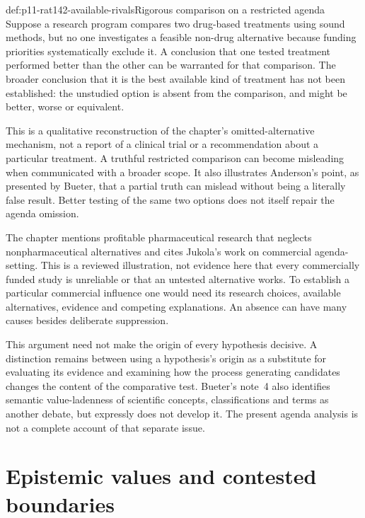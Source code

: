 \begin{hbexample}{def:p11-rat142-available-rivals}{Rigorous comparison on a restricted agenda}
Suppose a research program compares two drug-based treatments using sound
methods, but no one investigates a feasible non-drug alternative because
funding priorities systematically exclude it. A conclusion that one tested
treatment performed better than the other can be warranted for that
comparison. The broader conclusion that it is the best available kind of
treatment has not been established: the unstudied option is absent from
the comparison, and might be better, worse or equivalent.

This is a qualitative reconstruction of the chapter's omitted-alternative
mechanism, not a report of a clinical trial or a recommendation about a
particular treatment. A truthful restricted comparison can become misleading
when communicated with a broader scope. It also illustrates Anderson's
point, as presented by Bueter, that a partial truth can mislead without
being a literally false result. Better testing of the same two options
does not itself repair the agenda omission.
\end{hbexample}

The chapter mentions profitable pharmaceutical research that neglects
nonpharmaceutical alternatives and cites Jukola's work on commercial
agenda-setting. This is a reviewed illustration, not evidence here that
every commercially funded study is unreliable or that an untested alternative
works. To establish a particular commercial influence one would need its
research choices, available alternatives, evidence and competing explanations.
An absence can have many causes besides deliberate suppression.

This argument need not make the origin of every hypothesis decisive.
A distinction remains between using a hypothesis's origin as a substitute
for evaluating its evidence and examining how the process generating
candidates changes the content of the comparative test. Bueter's note~4
also identifies semantic value-ladenness of scientific concepts,
classifications and terms as another debate, but expressly does not develop
it. The present agenda analysis is not a complete account of that separate
issue.

\section{Epistemic values and contested boundaries}
\label{sec:p11-rat142-values}

